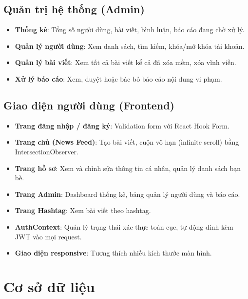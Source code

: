 \documentclass[a4paper]{article}
\begin{document}
\subsection{Quản trị hệ thống (Admin)}

\begin{itemize}
    \item \textbf{Thống kê}: Tổng số người dùng, bài viết, bình luận, báo cáo đang chờ xử lý.
    \item \textbf{Quản lý người dùng}: Xem danh sách, tìm kiếm, khóa/mở khóa tài khoản.
    \item \textbf{Quản lý bài viết}: Xem tất cả bài viết kể cả đã xóa mềm, xóa vĩnh viễn.
    \item \textbf{Xử lý báo cáo}: Xem, duyệt hoặc bác bỏ báo cáo nội dung vi phạm.
\end{itemize}

\subsection{Giao diện người dùng (Frontend)}

\begin{itemize}
    \item \textbf{Trang đăng nhập / đăng ký}: Validation form với React Hook Form.
    \item \textbf{Trang chủ (News Feed)}: Tạo bài viết, cuộn vô hạn (infinite scroll) bằng IntersectionObserver.
    \item \textbf{Trang hồ sơ}: Xem và chỉnh sửa thông tin cá nhân, quản lý danh sách bạn bè.
    \item \textbf{Trang Admin}: Dashboard thống kê, bảng quản lý người dùng và báo cáo.
    \item \textbf{Trang Hashtag}: Xem bài viết theo hashtag.
    \item \textbf{AuthContext}: Quản lý trạng thái xác thực toàn cục, tự động đính kèm JWT vào mọi request.
    \item \textbf{Giao diện responsive}: Tương thích nhiều kích thước màn hình.
\end{itemize}

\newpage

\section{Cơ sở dữ liệu}
\end{document}
